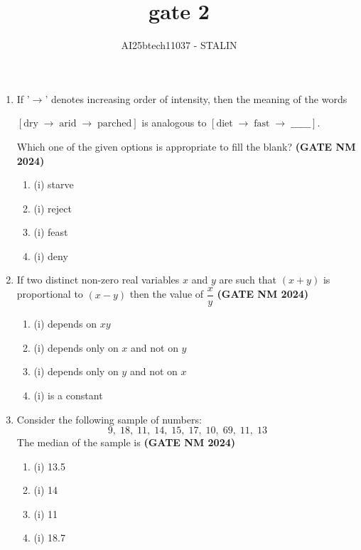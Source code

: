 \documentclass[journal,15pt,onecolumn]{IEEEtran}
\theoremstyle{remark}
\begin{document}
\title{gate 2}
\author{AI25btech11037 - STALIN}
\maketitle
\renewcommand{\thefigure}{\theenumi}
\renewcommand{\thetable}{\theenumi}




\begin{enumerate}




\item 
If '$\rightarrow$' denotes increasing order of intensity, then the meaning of the words 

$[ \text{dry} \;\to\; \text{arid} \;\to\; \text{parched} ]$    is analogous to     $[ \text{diet} \;\to\; \text{fast} \;\to\; \_\_\_\_\_\_ ]$.
 
Which one of the given options is appropriate to fill the blank?  \hfill \textbf{ (GATE NM 2024)}

\begin{enumerate}
\item (i) starve
\item (i) reject
\item (i) feast
\item (i) deny
\end{enumerate}


\item 
If two distinct non-zero real variables $x$ and $y$ are such that $(x+y)$ is proportional to $(x-y)$ then the value of $\dfrac{x}{y}$  \hfill \textbf{ (GATE NM 2024)}

\begin{enumerate}
\item (i) depends on $xy$
\item (i) depends only on $x$ and not on $y$
\item (i) depends only on $y$ and not on $x$
\item (i) is a constant
\end{enumerate}

 \item  Consider the following sample of numbers:  
    \[ 9, \; 18, \; 11, \; 14, \; 15, \; 17, \; 10, \; 69, \; 11, \; 13 \]  
    The median of the sample is\hfill \textbf{ (GATE NM 2024)}
    \begin{enumerate}
        \item (i) 13.5
        \item (i) 14
        \item (i) 11
        \item (i) 18.7
    \end{enumerate}
    

\end{enumerate}
\end{document}
